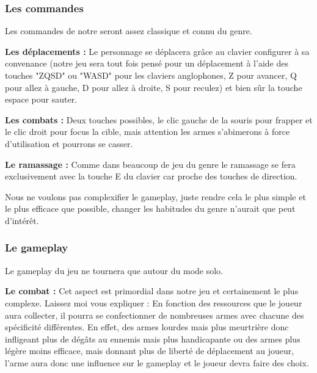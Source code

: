 \documentclass{article}
\begin{document}
\subsubsection{Les commandes}

\par
Les commandes de notre seront assez classique et connu du genre.
\newline

\par
\textbf{Les déplacements :} Le personnage se déplacera grâce au clavier configurer à sa convenance (notre jeu sera tout fois pensé pour un déplacement à l'aide des touches "ZQSD" ou "WASD" pour les claviers anglophones, Z pour avancer, Q pour allez à gauche, D pour allez à droite, S pour reculez) et bien sûr la touche espace pour sauter.
\newline

\par
\textbf{Les combats :} Deux touches possibles, le clic gauche de la souris pour frapper et le clic droit pour focus la cible, mais attention les armes s'abimerons à force d'utilisation et pourrons se casser.
\newline

\par
\textbf{Le ramassage :} Comme dans beaucoup de jeu du genre le ramassage se fera exclusivement avec la touche E du clavier car proche des touches de direction.
\newline

\par
Nous ne voulons pas complexifier le gameplay, juste rendre cela le plus simple et le plus efficace que possible, changer les habitudes du genre n'aurait que peut d'intérêt.
\newline

\subsubsection{Le gameplay}

\par
Le gameplay du jeu ne tournera que autour du mode solo.
\newline

\par
\textbf{Le combat :} 
Cet aspect est primordial dans notre jeu et certainement le plus complexe. Laissez moi vous expliquer : En fonction des ressources que le joueur aura collecter, il pourra se confectionner de nombreuses armes avec chacune des spécificité différentes. En effet, des armes lourdes mais plus meurtrière donc infligeant plus de dégâts au ennemis mais plus handicapante ou des armes plus légère moins efficace, mais donnant plus de liberté de déplacement au joueur, l'arme aura donc une influence sur le gameplay et le joueur devra faire des choix. 
\newline
\end{document}
